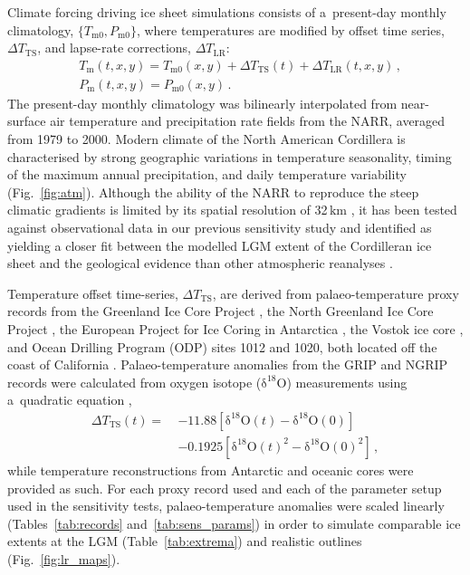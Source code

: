 \documentclass{article}
\newcommand{\chem}[1]{\ensuremath{\mathrm{#1}}}
\newcommand{\unit}[1]{\ensuremath{\mathrm{#1}}}
\begin{document}
      Climate forcing driving ice sheet simulations consists of
      a~present-day monthly climatology, $\{T_{\mathrm{m}0},
      P_{\mathrm{m}0}\}$, where temperatures are modified by offset time
      series, ${\Delta}T_{\text{TS}}$, and lapse-rate corrections,
      ${\Delta}T_{\text{LR}}$:
\begin{align}
&T_{\mathrm{m}}(t, x, y) = T_{\mathrm{m}0}(x, y) + {\Delta}T_{\text{TS}}(t)
                    + {\Delta}T_{\text{LR}}(t, x, y) \,, \\
&    P_{\mathrm{m}}(t, x, y) = P_{\mathrm{m}0}(x, y) \,.
\end{align}
      The present-day monthly climatology was bilinearly interpolated from
      near-surface air
      temperature and precipitation rate fields from the NARR, averaged from
      1979 to 2000. Modern climate of the North American Cordillera is
      characterised by strong geographic variations in temperature
      seasonality, timing of the maximum annual precipitation, and daily
      temperature variability (Fig.~\ref{fig:atm}). Although the ability
      of the NARR to reproduce the steep climatic gradients is limited by its
      spatial resolution of 32\,\unit{km} \citep{Jarosch.etal.2012}, it has
      been tested against observational data in our previous sensitivity
      study and identified as yielding a closer fit between the modelled LGM
      extent of the Cordilleran ice sheet and the geological evidence than
      other atmospheric reanalyses \citep{Seguinot.etal.2014}.

      Temperature offset time-series, ${\Delta}T_{\text{TS}}$, are derived
      from palaeo-temperature proxy records from the Greenland Ice Core
      Project \citep[GRIP,][]{Dansgaard.etal.1993}, the North Greenland Ice
      Core Project \citep[NGRIP,][]{Andersen.etal.2004}, the European
      Project for Ice Coring in Antarctica \citep[EPICA,][]
      {Jouzel.etal.2007}, the Vostok ice core \citep{Petit.etal.1999}, and
      Ocean Drilling Program (ODP) sites 1012 and 1020, both located off the
      coast of California \citep{Herbert.etal.2001}. Palaeo-temperature
      anomalies from the GRIP and NGRIP records were calculated from oxygen
      isotope (\chem{\delta^{18}O}) measurements using a~quadratic equation
      \citep{Johnsen.etal.1995},
\begin{align}
{\Delta}T_{\text{TS}}(t) ={~}&-11.88 [\chem{\delta^{18}O}(t)
                                -\chem{\delta^{18}O}(0)] \nonumber \\
                        &-0.1925[\chem{\delta^{18}O}(t)^2
                                 -\chem{\delta^{18}O}(0)^2] \,,
\end{align}
      while temperature reconstructions from Antarctic and oceanic cores
      were provided as such. For each proxy record used and each of the
      parameter setup used in the sensitivity tests, palaeo-temperature
      anomalies were scaled linearly (Tables~\ref{tab:records}
      and~\ref{tab:sens_params}) in order to simulate comparable ice extents
      at the LGM (Table~\ref{tab:extrema}) and realistic outlines
      (Fig.~\ref{fig:lr_maps}).
\end{document}
